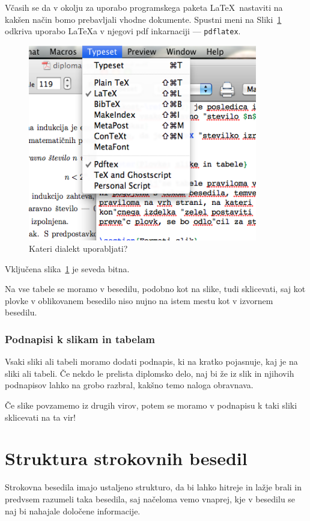 \documentclass[a4paper, 12pt]{book}
\begin{document}
Včasih se da v okolju za uporabo programskega paketa \LaTeX\ nastaviti na kakšen način bomo prebavljali vhodne dokumente. 
Spustni meni na Sliki~\ref{pic2} odkriva uporabo \LaTeX{}a v njegovi pdf inkarnaciji --- {\tt pdflatex}.
\begin{figure}[t]
\begin{center}
\includegraphics[width=10cm]{pic2.png}
\end{center}
\caption{Kateri dialekt uporabljati?}
\label{pic2}
\end{figure}
Vključena slika~\ref{pic2} je seveda bitna.

Na vse tabele se moramo v besedilu, podobno kot na slike, tudi sklicevati, saj kot plovke v oblikovanem besedilo niso nujno na istem mestu kot v izvornem besedilu.


\subsection{Podnapisi k slikam in tabelam}

Vsaki sliki ali tabeli moramo dodati podnapis, ki na kratko pojasnuje, kaj je na sliki ali tabeli. 
Če nekdo le prelista diplomsko delo, naj bi že iz slik in njihovih podnapisov lahko na grobo razbral, kakšno temo naloga obravnava.

Če slike povzamemo iz drugih virov, potem se moramo v podnapisu k taki sliki sklicevati na ta vir!


\chapter{Struktura strokovnih besedil}
\label{stroka}

Strokovna besedila imajo ustaljeno strukturo, da bi lahko hitreje in lažje brali in predvsem razumeli taka besedila, saj načeloma vemo vnaprej, 
kje v besedilu se naj bi nahajale določene informacije.
\end{document}
